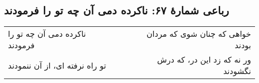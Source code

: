 \begin{center}
\section*{رباعی شمارهٔ ۶۷: ناکرده دمی آن چه تو را فرمودند}
\label{sec:067}
\begin{longtable}{l p{0.5cm} r}
ناکرده دمی آن چه تو را فرمودند
&&
خواهی که چنان شوی که مردان بودند
\\
تو راه نرفته ای، از آن ننمودند
&&
ور نه که زد این در، که درش نگشودند
\\
\end{longtable}
\end{center}
